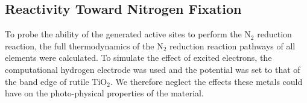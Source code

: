 \documentclass[catalysts,article,submit,moreauthors,pdftex,10pt,a4paper]{mdpi}
\theoremstyle{mdpi}
\newcounter{ex}
\newcounter{re}
\theoremstyle{mdpidefinition}
\begin{document}



\subsection{Reactivity Toward Nitrogen Fixation}

To probe the ability of the generated active sites to perform the N$_2$ reduction reaction, the full thermodynamics of the N$_2$ reduction reaction pathways of all elements were calculated. To simulate the effect of excited electrons, the computational hydrogen electrode was used and the potential was set to that of the band edge of rutile TiO$_2$. We therefore neglect the effects these metals could have on the photo-physical properties of the material.
\end{document}
